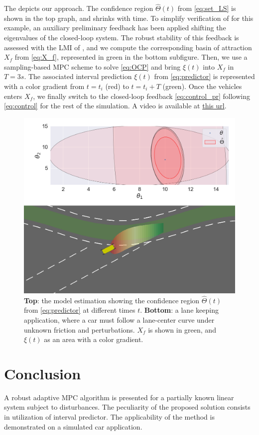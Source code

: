 \documentclass[letterpaper, 10 pt, conference]{ieeeconf}  %
\begin{document}
The  depicts our approach. The confidence region $\hat{\Theta}(t)$ from \eqref{eq:set_LS} is shown in the top graph, and shrinks with time. To simplify verification of  for this example, an auxiliary preliminary feedback has been applied shifting the eigenvalues of the closed-loop system. The robust stability of this feedback is assessed with the LMI of , and we compute the corresponding basin of attraction $X_f$ from \eqref{eq:X_f}, represented in green in the bottom subfigure. Then, we use a sampling-based MPC scheme \cite{HomemDeMello2014} to solve \eqref{eq:OCP} and bring $\xi(t)$ into $X_f$ in $T=3s$.  The associated interval prediction $\xi(t)$ from \eqref{eq:predictor} is represented with a color gradient from $t=t_i$ (red) to $t=t_i+T$ (green). Once the vehicles enters $X_f$, we finally switch to the closed-loop feedback \eqref{eq:control_pr} following \eqref{eq:control} for the rest of the simulation. A video is available at \href{https://drive.google.com/file/d/18I6lPgAjS8buMB09OCF6WcHtHzUr_ql_/view?usp=sharing}{this url}.
\begin{figure}
    \centering
    \includegraphics[width=\linewidth]{img/lane-keeping.png}
    \caption{\textbf{Top}: the model estimation showing the confidence region $\hat{\Theta}(t)$ from \eqref{eq:predictor} at different times $t$. \textbf{Bottom}: a lane keeping application, where a car must follow a lane-center curve under unknown friction and perturbations. $X_f$ is shown in green, and $\xi(t)$ as an area with a color gradient.}
    \label{fig:lane-keeping}
\end{figure}

\section*{Conclusion}

A robust adaptive MPC algorithm is presented for a partially known
linear system subject to disturbances. The peculiarity of the proposed
solution consists in utilization of interval predictor. The applicability
of the method is demonstrated on a simulated car application.



\end{document}
